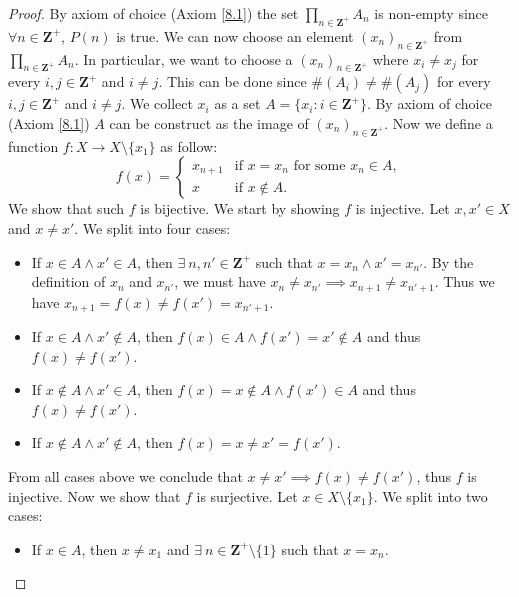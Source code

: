 \begin{proof}
    By axiom of choice (Axiom \ref{8.1}) the set \(\prod_{n \in \mathbf{Z}^+} A_n\) is non-empty since \(\forall n \in \mathbf{Z}^+\), \(P(n)\) is true.
    We can now choose an element \((x_n)_{n \in \mathbf{Z}^+}\) from \(\prod_{n \in \mathbf{Z}^+} A_n\).
    In particular, we want to choose a \((x_n)_{n \in \mathbf{Z}^+}\) where \(x_i \neq x_j\) for every \(i, j \in \mathbf{Z}^+\) and \(i \neq j\).
    This can be done since \(\#(A_i) \neq \#(A_j)\) for every \(i, j \in \mathbf{Z}^+\) and \(i \neq j\).
    We collect \(x_i\) as a set \(A = \{x_i : i \in \mathbf{Z}^+\}\).
    By axiom of choice (Axiom \ref{8.1}) \(A\) can be construct as the image of \((x_n)_{n \in \mathbf{Z}^+}\).
    Now we define a function \(f : X \to X \setminus \{x_1\}\) as follow:
    \[
        f(x) = \begin{cases}
            x_{n + 1} & \text{if } x = x_n \text{ for some } x_n \in A, \\
            x         & \text{if } x \notin A.
        \end{cases}
    \]
    We show that such \(f\) is bijective.
    We start by showing \(f\) is injective.
    Let \(x, x' \in X\) and \(x \neq x'\).
    We split into four cases:
    \begin{itemize}
        \item If \(x \in A \land x' \in A\), then \(\exists\ n, n' \in \mathbf{Z}^+\) such that \(x = x_n \land x' = x_{n'}\).
              By the definition of \(x_n\) and \(x_{n'}\), we must have \(x_n \neq x_{n'} \implies x_{n + 1} \neq x_{n' + 1}\).
              Thus we have \(x_{n + 1} = f(x) \neq f(x') = x_{n' + 1}\).
        \item If \(x \in A \land x' \notin A\), then \(f(x) \in A \land f(x') = x' \notin A\) and thus \(f(x) \neq f(x')\).
        \item If \(x \notin A \land x' \in A\), then \(f(x) = x \notin A \land f(x') \in A\) and thus \(f(x) \neq f(x')\).
        \item If \(x \notin A \land x' \notin A\), then \(f(x) = x \neq x' = f(x')\).
    \end{itemize}
    From all cases above we conclude that \(x \neq x' \implies f(x) \neq f(x')\), thus \(f\) is injective.
    Now we show that \(f\) is surjective.
    Let \(x \in X \setminus \{x_1\}\).
    We split into two cases:
    \begin{itemize}
        \item If \(x \in A\), then \(x \neq x_1\) and \(\exists\ n \in \mathbf{Z}^+ \setminus \{1\}\) such that \(x = x_n\).

\end{itemize}
\end{proof}
